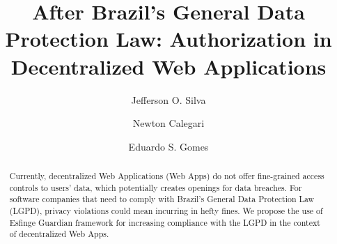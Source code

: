\documentclass[sigconf]{acmart}
\begin{document}
%
\title[After Brazil's GDPR: Authorization in Decentralized Web Applications]{After Brazil's General Data Protection Law: Authorization in Decentralized Web Applications}

%
\author{Jefferson O. Silva}

\author{Newton Calegari}

\author{Eduardo S. Gomes}

%
\renewcommand{\shortauthors}{Silva et al.}

%
\begin{abstract}
Currently, decentralized Web Applications (Web Apps) do not offer fine-grained access controls to users' data, which potentially creates openings for data breaches. For software companies that need to comply with Brazil's General Data Protection Law (LGPD), privacy violations could mean incurring in hefty fines. We propose the use of Esfinge Guardian framework for increasing compliance with the LGPD in the context of decentralized Web Apps.
\end{abstract}

%

%
\maketitle
\end{document}
